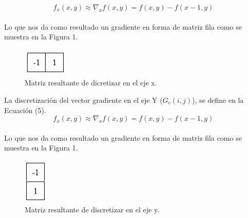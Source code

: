 \documentclass[conference]{IEEEtran}
\begin{document}
\begin{equation}
	f_{x}(x,y) \approx \nabla_{x}f(x,y) = f(x,y)-f(x-1,y)
\end{equation}
\\ Lo que nos da como resultado un gradiente en forma de matriz fila como se muestra en la Figura 1.
\begin{figure}[h]
	\centering
	\setlength{\unitlength}{0.00105in}
	\includegraphics[scale=0.50]{./images/fx.png}	
	\caption{Matriz resultante de dicretizar en el eje x.}	
\end{figure}

La discretizaci\'on del vector gradiente en el eje Y ($G_{c}(i,j)$), se define en la Ecuaci\'on (5).\\
\begin{equation}
	f_{x}(x,y) \approx \nabla_{x}f(x,y) = f(x,y)-f(x-1,y)
\end{equation}
\\ Lo que nos da como resultado un gradiente en forma de matriz fila como se muestra en la Figura 1.
\begin{figure}[h]
	\centering
	\setlength{\unitlength}{0.00105in}
	\includegraphics[scale=0.50]{./images/fy.png}	
	\caption{Matriz resultante de discretizar en el eje y.}	
\end{figure}
\end{document}
